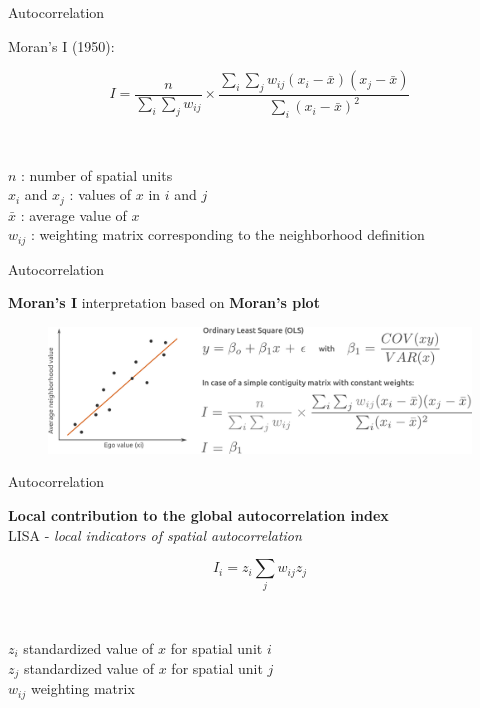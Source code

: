 \begin{frame}{Autocorrelation}

Moran's I (1950):

$$
I = \frac{n}{\sum_{i} \sum_{j} w_{ij}} \times \frac{\sum_{i} \sum_{j} w_{ij} (x_i - \bar{x})(x_j - \bar{x})}{\sum_{i} (x_i - \bar{x})^2}
$$

~

$n$ : number of spatial units \\ 
$x_i$ and $x_j$ : values of $x$ in $i$ and $j$ \\ 
$\bar{x}$ : average value of $x$ \\ 
$w_{ij}$ : weighting matrix corresponding to the neighborhood definition

\end{frame}



\begin{frame}{Autocorrelation}

\textbf{Moran's I} interpretation based on \textbf{Moran's plot}

\begin{figure}
\includegraphics[width=12cm]{MoranPlot.pdf}
\end{figure}

\end{frame}


\begin{frame}{Autocorrelation}

\textbf{Local contribution to the global autocorrelation index} \\
LISA - \emph{local indicators of spatial autocorrelation}

$$
I_i = z_i \sum_{j} w_{ij} z_j
$$

~

$z_i$ standardized value of $x$ for spatial unit $i$ \\
$z_j$ standardized value of $x$ for spatial unit $j$ \\
$w_{ij}$ weighting matrix

\end{frame}


